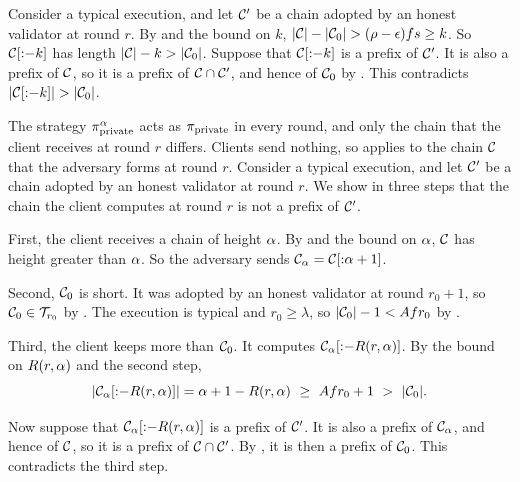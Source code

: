 \begin{proofof}{}
    Consider a typical execution, and let $\mathcal{C}'$ be a chain adopted by an
    honest validator at round $r$. By  and the bound on $k$,
    $\lvert \mathcal{C}\rvert-\lvert \mathcal{C}_0\rvert>(\rho-\epsilon)fs\ge k$. So $\mathcal{C}[{:}{-}k]$
    has length $\lvert \mathcal{C}\rvert-k>\lvert \mathcal{C}_0\rvert$. Suppose that $\mathcal{C}[{:}{-}k]$ is a
    prefix of $\mathcal{C}'$. It is also a prefix of $\mathcal{C}$, so it is a prefix of
    $\mathcal{C}\cap\mathcal{C}'$, and hence of $\mathcal{C}_0$ by . This
    contradicts $\lvert \mathcal{C}[{:}{-}k]\rvert>\lvert \mathcal{C}_0\rvert$.
\end{proofof}

\begin{proofof}{}
    The strategy $\pi_{\mathrm{private}}^\alpha$ acts as $\pi_{\mathrm{private}}$ in every round, and only the
    chain that the client receives at round $r$ differs. Clients send nothing,
    so  applies to the chain $\mathcal{C}$ that the adversary forms
    at round $r$. Consider a typical execution, and let $\mathcal{C}'$ be a chain
    adopted by an honest validator at round $r$. We show in
    three steps that the chain the client computes at round $r$ is not a
    prefix of $\mathcal{C}'$.

    First, the client receives a chain of height $\alpha$. By
     and the bound on $\alpha$, $\mathcal{C}$ has height greater than
    $\alpha$. So the adversary sends $\mathcal{C}_\alpha=\mathcal{C}[{:}\alpha+1]$.

    Second, $\mathcal{C}_0$ is short. It was adopted by an honest validator at round
    $r_0+1$, so $\mathcal{C}_0\in\mathcal{T}_{r_0}$ by . The execution is
    typical and $r_0\ge\lambda$, so $\lvert \mathcal{C}_0\rvert-1<A fr_0$ by
    .

    Third, the client keeps more than $\mathcal{C}_0$. It computes
    $\mathcal{C}_\alpha[{:}{-}R(r,\alpha)]$. By the bound on $R(r,\alpha)$ and the second
    step,
    \[
        \len{\prune{\ch_\hgt}{R(r,\hgt)}}=\hgt+1-R(r,\hgt)\ \ge\ \maxr fr_0+1\ >\ \len{\ch_0} .
    \]

    Now suppose that $\mathcal{C}_\alpha[{:}{-}R(r,\alpha)]$ is a prefix of $\mathcal{C}'$. It
    is also a prefix of $\mathcal{C}_\alpha$, and hence of $\mathcal{C}$, so it is a prefix of
    $\mathcal{C}\cap\mathcal{C}'$. By , it is then a prefix of $\mathcal{C}_0$. This
    contradicts the third step.
\end{proofof}

